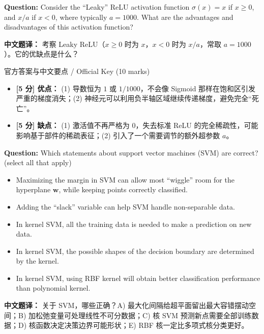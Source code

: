 \textbf{Question:} Consider the ``Leaky'' ReLU activation function $\sigma(x) = x$ if $x\ge 0$, and $x/a$ if $x < 0$, where typically $a = 1000$. What are the advantages and disadvantages of this activation function?

\textbf{中文题译：} 考察 Leaky ReLU（$x\ge 0$ 时为 $x$，$x<0$ 时为 $x/a$，常取 $a=1000$）。它的优缺点是什么？

\begin{StudySolution}{官方答案与中文要点 / Official Key (10 marks)}
\begin{itemize}
\item \textbf{[5 分] 优点：} (1) 导数恒为 $1$ 或 $1/1000$，不会像 Sigmoid 那样在饱和区引发严重的梯度消失；(2) 神经元可以利用负半轴区域继续传递梯度，避免完全“死亡”。
\item \textbf{[5 分] 缺点：} (1) 激活值不再严格为 0，失去标准 ReLU 的完全稀疏性，可能影响基于部件的稀疏表征；(2) 引入了一个需要调节的额外超参数 $a$。
\end{itemize}
\end{StudySolution}




\textbf{Question:} Which statements about support vector machines (SVM) are correct? (select all that apply)
\begin{itemize}
\item[A)] Maximizing the margin in SVM can allow most ``wiggle'' room for the hyperplane $\mathbf{w}$, while keeping points correctly classified.
\item[B)] Adding the ``slack'' variable can help SVM handle non-separable data.
\item[C)] In kernel SVM, all the training data is needed to make a prediction on new data.
\item[D)] In kernel SVM, the possible shapes of the decision boundary are determined by the kernel.
\item[E)] In kernel SVM, using RBF kernel will obtain better classification performance than polynomial kernel.
\end{itemize}
\textbf{中文题译：} 关于 SVM，哪些正确？A) 最大化间隔给超平面留出最大容错摆动空间；B) 加松弛变量可处理线性不可分数据；C) 核 SVM 预测新点需要全部训练数据；D) 核函数决定决策边界可能形状；E) RBF 核一定比多项式核分类更好。

